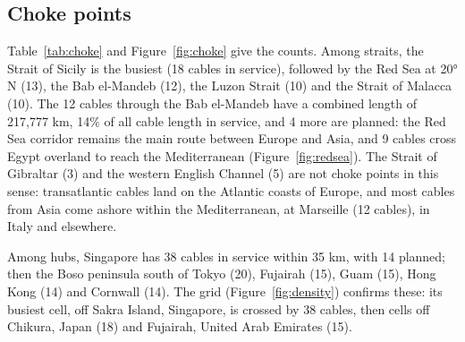 \documentclass[11pt,a4paper]{article}
\begin{document}
\subsection{Choke points}
Table~\ref{tab:choke} and Figure~\ref{fig:choke} give the counts. Among straits, the Strait of Sicily is the busiest (18 cables in service), followed by the Red Sea at 20° N (13), the Bab el-Mandeb (12), the Luzon Strait (10) and the Strait of Malacca (10). The 12 cables through the Bab el-Mandeb have a combined length of 217,777 km, 14\% of all cable length in service, and 4 more are planned: the Red Sea corridor remains the main route between Europe and Asia, and 9 cables cross Egypt overland to reach the Mediterranean (Figure~\ref{fig:redsea}). The Strait of Gibraltar (3) and the western English Channel (5) are not choke points in this sense: transatlantic cables land on the Atlantic coasts of Europe, and most cables from Asia come ashore within the Mediterranean, at Marseille (12 cables), in Italy and elsewhere.

Among hubs, Singapore has 38 cables in service within 35 km, with 14 planned; then the Boso peninsula south of Tokyo (20), Fujairah (15), Guam (15), Hong Kong (14) and Cornwall (14). The grid (Figure~\ref{fig:density}) confirms these: its busiest cell, off Sakra Island, Singapore, is crossed by 38 cables, then cells off Chikura, Japan (18) and Fujairah, United Arab Emirates (15).
\end{document}
